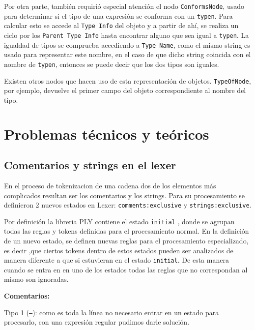 \documentclass[11pt]{scrartcl} %
\begin{document}
Por otra parte, también requirió especial atención el nodo \texttt{ConformsNode}, usado para determinar si el tipo de una expresión se conforma con un \texttt{typen}. Para calcular esto se accede al \texttt{Type Info} del objeto y a partir de ahí, se realiza un ciclo por los \texttt{Parent Type Info} hasta encontrar alguno que sea igual a \texttt{typen}. La igualdad de tipos se comprueba accediendo a \texttt{Type Name}, como el mismo string es usado para representar este nombre, en el caso de que dicho string coincida con el nombre de \texttt{typen}, entonces se puede decir que los dos tipos son iguales.

Existen otros nodos que hacen uso de esta representación de objetos. \texttt{TypeOfNode}, por ejemplo, devuelve el primer campo del objeto correspondiente al nombre del tipo.


\section{Problemas técnicos y teóricos}

\subsection{Comentarios y strings en el lexer}

En el proceso de tokenizacion de una cadena dos de los elementos más complicados resultan ser los comentarios y los strings. Para su procesamiento  se definieron 2 nuevos estados en Lexer: \texttt{comments:exclusive} y \texttt{strings:exclusive}.

Por definición la libreria PLY contiene el estado \texttt{initial} , donde se agrupan todas las reglas y tokens definidas para el procesamiento normal. En la definición de un nuevo estado, se definen nuevas reglas para el procesamiento especializado, es decir ,que ciertos tokens dentro de estos estados pueden ser analizados de manera diferente a que si estuvieran en el estado \texttt{initial}. 
De  esta manera cuando se entra en en uno de los estados todas las reglas que no correspondan al mismo son ignoradas.

\textbf{Comentarios:}

Tipo 1 (\texttt{--}): como es toda la línea no necesario entrar en un estado para procesarlo, con una expresión regular pudimos darle solución.
\end{document}
